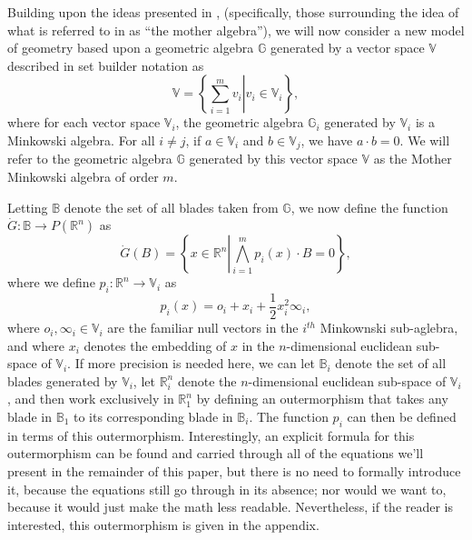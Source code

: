 \documentclass{birkjour}
\theoremstyle{definition}
\theoremstyle{remark}
\numberwithin{equation}{section}
\newcommand{\R}{\mathbb{R}}
\newcommand{\B}{\mathbb{B}}
\newcommand{\G}{\mathbb{G}}
\newcommand{\V}{\mathbb{V}}
\newcommand{\Gd}{\dot{G}}
\newcommand{\nvai}{\infty}
\newcommand{\nvao}{o}
\begin{document}
Building upon the ideas presented in \cite{DoranHestenes93}, (specifically,
those surrounding the idea of what is referred to in \cite{DoranHestenes93}
as ``the mother algebra''), we will now consider
a new model of geometry based upon a geometric algebra $\G$
generated by a vector space $\V$ described in set builder notation as
\begin{equation*}
\V = \left\{\left.\sum_{i=1}^m v_i\right|v_i\in\V_i\right\},
\end{equation*}
where for each vector space $\V_i$, the geometric algebra $\G_i$ generated by $\V_i$
is a Minkowski algebra.  For all $i\neq j$, if $a\in\V_i$
and $b\in\V_j$, we have $a\cdot b=0$.  We will refer to the geometric algebra $\G$
generated by this vector space $\V$ as the Mother Minkowski algebra of order $m$.

Letting $\B$ denote the set
of all blades taken from $\G$, we now define the function $\Gd:\B\to P(\R^n)$ as
\begin{equation}\label{equ_Gd}
\Gd(B) = \left\{x\in\R^n\left|\bigwedge_{i=1}^m p_i(x)\cdot B=0\right\}\right.,
\end{equation}
where we define $p_i:\R^n\to\V_i$ as
\begin{equation}\label{equ_p_i}
p_i(x) = \nvao_i + x_i + \frac{1}{2}x_i^2\nvai_i,
\end{equation}
where $\nvao_i,\nvai_i\in\V_i$ are the familiar null vectors in the $i^{th}$ Minkownski sub-aglebra,
and where $x_i$ denotes the embedding
of $x$ in the $n$-dimensional euclidean sub-space of $\V_i$.  If more precision is needed here,
we can let $\B_i$ denote the set of all blades generated by $\V_i$,
let $\R_i^n$ denote the $n$-dimensional euclidean sub-space of $\V_i$, and then
work exclusively in $\R_1^n$ by defining an outermorphism that takes any blade in $\B_1$
to its corresponding blade in $\B_i$.  The function $p_i$ can then be defined in terms
of this outermorphism.  Interestingly, an explicit formula for this outermorphism can be found and carried through
all of the equations we'll present in the remainder of this paper, but there is no need to
formally introduce it, because the equations still go through in its absence; nor would we want to,
because it would just make the math less readable.  Nevertheless, if the reader is
interested, this outermorphism is given in the appendix.
\end{document}
